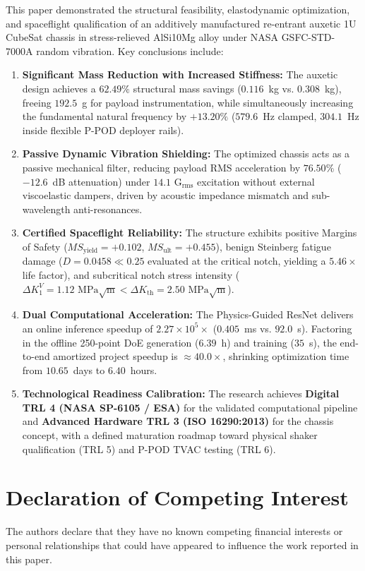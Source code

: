 \documentclass[preprint,12pt,3p]{elsarticle}
\begin{document}
This paper demonstrated the structural feasibility, elastodynamic optimization, and spaceflight qualification of an additively manufactured re-entrant auxetic 1U CubeSat chassis in stress-relieved AlSi10Mg alloy under NASA GSFC-STD-7000A random vibration. Key conclusions include:
\begin{enumerate}
  \item \textbf{Significant Mass Reduction with Increased Stiffness:} The auxetic design achieves a $62.49\%$ structural mass savings ($0.116$~kg vs. $0.308$~kg), freeing $192.5$~g for payload instrumentation, while simultaneously increasing the fundamental natural frequency by $+13.20\%$ ($579.6$~Hz clamped, $304.1$~Hz inside flexible P-POD deployer rails).
  \item \textbf{Passive Dynamic Vibration Shielding:} The optimized chassis acts as a passive mechanical filter, reducing payload RMS acceleration by $76.50\%$ ($-12.6$~dB attenuation) under $14.1\text{ G}_{\text{rms}}$ excitation without external viscoelastic dampers, driven by acoustic impedance mismatch and sub-wavelength anti-resonances.
  \item \textbf{Certified Spaceflight Reliability:} The structure exhibits positive Margins of Safety ($MS_{\text{yield}} = +0.102$, $MS_{\text{ult}} = +0.455$), benign Steinberg fatigue damage ($D = 0.0458 \ll 0.25$ evaluated at the critical notch, yielding a $5.46\times$ life factor), and subcritical notch stress intensity ($\Delta K_1^V = 1.12\text{ MPa}\sqrt{\text{m}} < \Delta K_{\text{th}} = 2.50\text{ MPa}\sqrt{\text{m}}$).
  \item \textbf{Dual Computational Acceleration:} The Physics-Guided ResNet delivers an online inference speedup of $2.27 \times 10^5\times$ ($0.405$~ms vs. $92.0$~s). Factoring in the offline 250-point DoE generation ($6.39$~h) and training ($35$~s), the end-to-end amortized project speedup is $\approx 40.0\times$, shrinking optimization time from $10.65$~days to $6.40$~hours.
  \item \textbf{Technological Readiness Calibration:} The research achieves \textbf{Digital TRL 4 (NASA SP-6105 / ESA)} for the validated computational pipeline and \textbf{Advanced Hardware TRL 3 (ISO 16290:2013)} for the chassis concept, with a defined maturation roadmap toward physical shaker qualification (TRL 5) and P-POD TVAC testing (TRL 6).
\end{enumerate}

\section*{Declaration of Competing Interest}
The authors declare that they have no known competing financial interests or personal relationships that could have appeared to influence the work reported in this paper.
\end{document}
